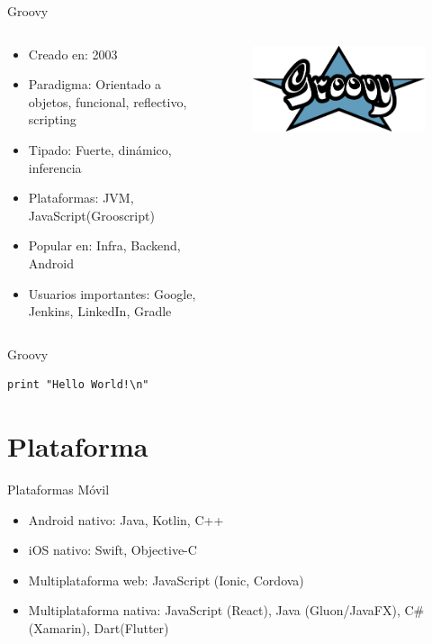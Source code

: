 \documentclass[aspectratio=169]{beamer}
\begin{document}
\begin{frame}{Groovy}
	\begin{columns}[T] %
		\begin{column}[T]{0.5\textwidth} %
			\begin{itemize}
				\item Creado en: 2003
				\item Paradigma: Orientado a objetos, funcional, reflectivo, scripting
				\item Tipado: Fuerte, dinámico, inferencia
				\item Plataformas: JVM, JavaScript(Grooscript)
				\item Popular en: Infra, Backend, Android
				\item Usuarios importantes: Google, Jenkins, LinkedIn, Gradle
			\end{itemize}
		\end{column}
		\begin{column}[T]{7cm} %
			\begin{figure}
				\centering
				\includegraphics[width=0.5\linewidth]{Images/groovy}
			\end{figure}
			
		\end{column}
	\end{columns}
\end{frame}

\begin{frame}[fragile]{Groovy}
\begin{lstlisting}
print "Hello World!\n"
\end{lstlisting}
\end{frame}



\section{Plataforma}

\begin{frame}{Plataformas}
    Móvil
	\begin{itemize}
	\item Android nativo: Java, Kotlin, C++
    \item iOS nativo: Swift, Objective-C
    \item Multiplataforma web: JavaScript (Ionic, Cordova)
    \item Multiplataforma nativa: JavaScript (React), Java (Gluon/JavaFX), C\# (Xamarin), Dart(Flutter)
	\end{itemize}
\end{frame}
\end{document}

